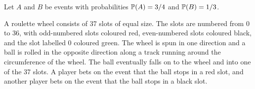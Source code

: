 \begin{exercise}
\begin{questions}
\question
Let $A$ and $B$ be events with probabilities $\mathbb{P}(A)=3/4$ and $\mathbb{P}(B)=1/3$. 
\question
A roulette wheel consists of 37 slots of equal size. The slots are numbered from 0 to 36, with odd-numbered slots coloured red, even-numbered slots coloured black, and the slot labelled 0 coloured green. The wheel is spun in one direction and a ball is rolled in the opposite direction along a track running around the circumference of the wheel. The ball eventually falls on to the wheel and into one of the 37 slots. A player bets on the event that the ball stops in a red slot, and another player bets on the event that the ball stops in a black slot.
\begin{parts}

\end{parts}
\end{questions}
\end{exercise}
